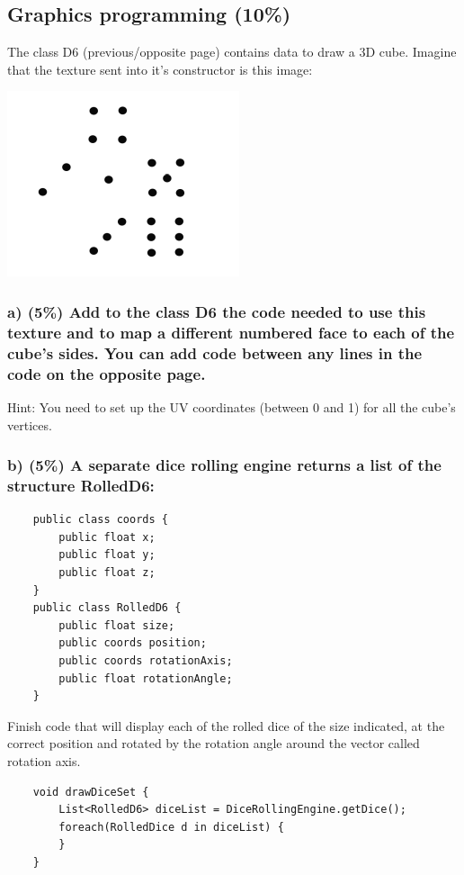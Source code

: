\subsection{Graphics programming (10\%)}
The class D6 (previous/opposite page) contains data to draw a 3D cube.  Imagine that the texture sent into it's constructor is this image:

\includegraphics{sections/tasks/res/tgra-2013-07-dice-texture.png}

\subsubsection{a) (5\%) Add to the class D6 the code needed to use this texture and to map a different numbered face to each of the cube's sides. You can add code between any lines in the code on the opposite page.}
Hint: You need to set up the UV coordinates (between 0 and 1) for all the cube's vertices.

\subsubsection{b) (5\%) A separate dice rolling engine returns a list of the structure RolledD6:}

\begin{verbatim}
    public class coords {
        public float x;
        public float y;
        public float z;
    }
    public class RolledD6 {
        public float size;
        public coords position;
        public coords rotationAxis;
        public float rotationAngle;
    }
\end{verbatim}

Finish code that will display each of the rolled dice of the size indicated, at the correct position and rotated by the rotation angle around the vector called rotation axis.

\begin{verbatim}
    void drawDiceSet {
        List<RolledD6> diceList = DiceRollingEngine.getDice();
        foreach(RolledDice d in diceList) {
        }
    }
\end{verbatim}